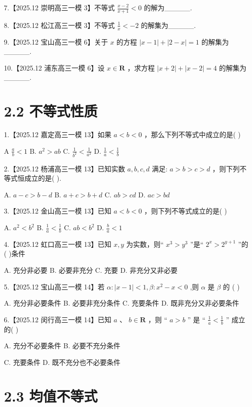 \documentclass[10pt]{article}
\begin{document}
7.【2025.12 崇明高三一模 3】不等式 \(\frac{x - 2}{x + 1} < 0\) 的解为\_\_\_\_\_.

8.【2025.12 松江高三一模 3】不等式 \(\frac{1}{x} <  - 2\) 的解集为\_\_\_\_\_.

9.【2025.12 宝山高三一模 6】关于 \(x\) 的方程 \(\left| {x - 1}\right|  + \left| {2 - x}\right|  = 1\) 的解集为\_\_\_\_\_.

10.【2025.12 浦东高三一模 6】设 \(x \in  \mathbf{R}\) ，求方程 \(\left| {x + 2}\right|  + \left| {x - 2}\right|  = 4\) 的解集为\_\_\_\_\_.

\section*{2.2 不等式性质}

1.【2025.12 嘉定高三一模 13】如果 \(a < b < 0\) ，那么下列不等式中成立的是( )

A \(\frac{a}{b} < 1\) B. \({a}^{2} > {ab}\) C. \(\frac{1}{{b}^{2}} < \frac{1}{{a}^{2}}\) D. \(\frac{1}{a} < \frac{1}{b}\)

2.【2025.12 杨浦高三一模 13】已知实数 \(a,b,c,d\) 满足: \(a > b > c > d\) ，则下列不等式恒成立的是( ).

A. \(a - c > b - d\) B. \(a + c > b + d\) C. \({ab} > {cd}\) D. \({ac} > {bd}\)

3.【2025.12 金山高三一模 13】已知 \(a < b < 0\) ，则下列不等式成立的是( )

A. \({a}^{2} < {b}^{2}\) B. \(\frac{1}{a} < \frac{1}{b}\) C. \({ab} < {b}^{2}\) D. \(\frac{b}{a} < 1\)

4.【2025.12 虹口高三一模 13】已知 \(x,y\) 为实数，则“ \({x}^{3} > {y}^{3}\) ”是“ \({2}^{x} > {2}^{y + 1}\) ”的( )条件

A. 充分非必要 B. 必要非充分 C. 充要 D. 非充分又非必要

5.【2025.12 宝山高三一模 14】若 \(\alpha  : \left| {x - 1}\right|  < 1,\beta  : {x}^{2} - x < 0\) ,则 \(\alpha\) 是 \(\beta\) 的 ( )

A. 充分非必要条件 B. 必要非充分条件 C. 充要条件 D. 既非充分又非必要条件

6.【2025.12 闵行高三一模 14】已知 \(a\text{ 、 }b \in  \mathbf{R}\) ，则 “ \(a > b\) ” 是 “ \(\frac{1}{a} < \frac{1}{b}\) ” 成立的( )

A. 充分不必要条件 B. 必要不充分条件

C. 充要条件 D. 既不充分也不必要条件

\section*{2.3 均值不等式}
\end{document}
